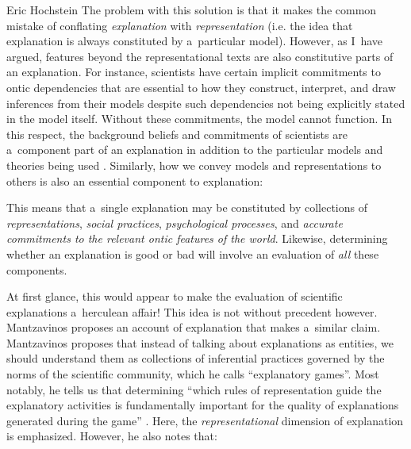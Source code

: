 \begin{artengenv}{Eric Hochstein}
The problem with this solution is that it makes the common mistake of conflating \textit{explanation} with \textit{representation} (i.e. the idea that explanation is always constituted by a~particular model). However, as I~have argued, features beyond the representational texts are also constitutive parts of an explanation. For instance, scientists have certain implicit commitments to ontic dependencies that are essential to how they construct, interpret, and draw inferences from their models despite such dependencies not being explicitly stated in the model itself. Without these commitments, the model cannot function. In this respect, the background beliefs and commitments of scientists are a~component part of an explanation in addition to the particular models and theories being used
\parencites[see:][]{bokulich_representing_2018}[][]{hochstein_how_2019}. %
 Similarly, how we convey models and representations to others is also an essential component to explanation:


This means that a~single explanation may be constituted by collections of \textit{representations}, \textit{social practices}, \textit{psychological processes}, and \textit{accurate commitments to the relevant ontic features of the world}. Likewise, determining whether an explanation is good or bad will involve an evaluation of \textit{all} these components.

At first glance, this would appear to make the evaluation of scientific explanations a~herculean affair! This idea is not without precedent however. Mantzavinos
\parencite*[][]{mantzavinos_explanatory_2016} %
 proposes an account of explanation that makes a~similar claim. Mantzavinos proposes that instead of talking about explanations as entities, we should understand them as collections of inferential practices governed by the norms of the scientific community, which he calls ``explanatory games''. Most notably, he tells us that determining ``which rules of representation guide the explanatory activities is fundamentally important for the quality of explanations generated during the game'' 
\parencite[][p.42]{mantzavinos_explanatory_2016}. %
 Here, the \textit{representational} dimension of explanation is emphasized. However, he also notes that:


\end{artengenv}
